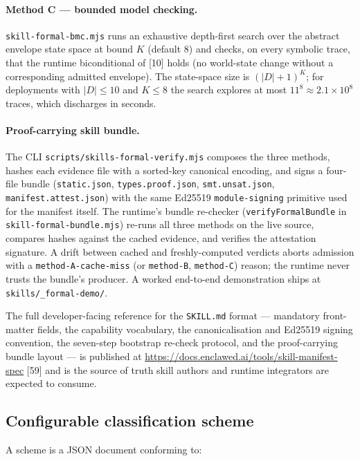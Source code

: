\documentclass[11pt]{article}
\begin{document}
\paragraph{Method C --- bounded model checking.}
\texttt{skill-formal-bmc.mjs} runs an exhaustive depth-first search
over the abstract envelope state space at bound $K$ (default 8) and
checks, on every symbolic trace, that the runtime biconditional of
[10] holds (no world-state change without a corresponding admitted
envelope). The state-space size is
$(\lvert D \rvert + 1)^{K}$; for deployments with
$\lvert D \rvert \le 10$ and $K \le 8$ the search explores at most
$11^{8} \approx 2.1 \times 10^{8}$ traces, which discharges in
seconds.

\paragraph{Proof-carrying skill bundle.} The CLI
\texttt{scripts/skills-formal-verify.mjs} composes the three methods,
hashes each evidence file with a sorted-key canonical encoding, and
signs a four-file bundle (\texttt{static.json}, \texttt{types.proof.json},
\texttt{smt.unsat.json}, \texttt{manifest.attest.json}) with the same
Ed25519 \texttt{module-signing} primitive used for the manifest itself.
The runtime's bundle re-checker
(\texttt{verifyFormalBundle} in \texttt{skill-formal-bundle.mjs})
re-runs all three methods on the live source, compares hashes against
the cached evidence, and verifies the attestation signature. A drift
between cached and freshly-computed verdicts aborts admission with a
\texttt{method-A-cache-miss} (or \texttt{method-B}, \texttt{method-C})
reason; the runtime never trusts the bundle's producer. A worked
end-to-end demonstration ships at \texttt{skills/\_formal-demo/}.

The full developer-facing reference for the \texttt{SKILL.md} format
--- mandatory front-matter fields, the capability vocabulary, the
canonicalisation and Ed25519 signing convention, the seven-step
bootstrap re-check protocol, and the proof-carrying bundle layout
--- is published at
\url{https://docs.enclawed.ai/tools/skill-manifest-spec} [59] and
is the source of truth skill authors and runtime integrators are
expected to consume.

\subsection{Configurable classification scheme}

A scheme is a JSON document conforming to:
\end{document}
